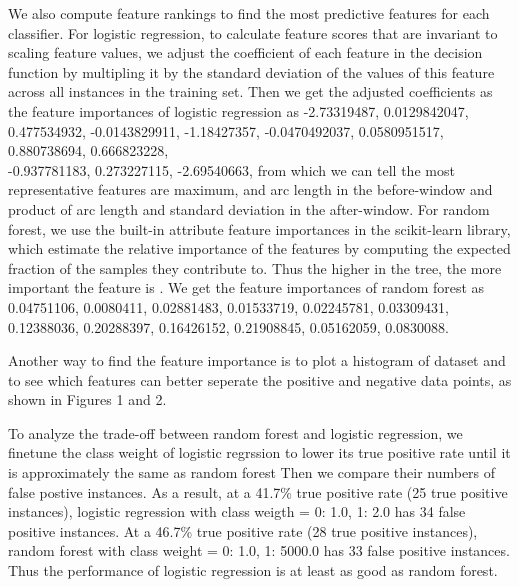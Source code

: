 \documentclass{soups}
\begin{document}
We also compute feature rankings to find the most predictive features for each classifier. For logistic regression, to calculate feature scores that are invariant to scaling feature values, we adjust the coefficient of each feature in the decision function by multipling it by the standard deviation of the values of this feature across all instances in the training set. Then we get the adjusted coefficients as the feature importances of logistic regression as -2.73319487, 0.0129842047, 0.477534932, -0.0143829911, -1.18427357, -0.0470492037, 0.0580951517, 0.880738694, 0.666823228, \\ -0.937781183, 0.273227115, -2.69540663, from which we can tell the most representative features are maximum, and arc length in the before-window and product of arc length and standard deviation in the after-window. For random forest, we use the built-in attribute feature importances in the scikit-learn library, which estimate the relative importance of the features by computing the expected fraction of the samples they contribute to. Thus the higher in the tree, the more important the feature is \cite{sklearn:rfdoc}. We get the feature importances of random forest as 0.04751106, 0.0080411, 0.02881483, 0.01533719, 0.02245781, 0.03309431, 0.12388036, 0.20288397, 0.16426152, 0.21908845, 0.05162059, 0.0830088.

Another way to find the feature importance is to plot a histogram of dataset and to see which features can better seperate the positive and negative data points, as shown in Figures 1 and 2.

To analyze the trade-off between random forest and logistic regression, we finetune the class weight of logistic regrssion to lower its true positive rate until it is approximately the same as random forest Then we compare their numbers of false postive instances. As a result, at a 41.7\% true positive rate (25 true positive instances), logistic regression with class weigth = {0: 1.0, 1: 2.0} has 34 false positive instances. At a 46.7\% true positive rate (28 true positive instances), random forest with class weight = {0: 1.0, 1: 5000.0} has 33 false positive instances. Thus the performance of logistic regression is at least as good as random forest.
\end{document}
